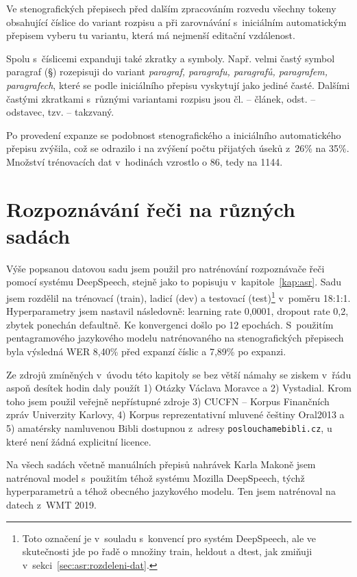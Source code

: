 Ve stenografických přepisech před dalším zpracováním rozvedu všechny tokeny
obsahující číslice do variant rozpisu a při zarovnávání s~iniciálním
automatickým přepisem vyberu tu variantu, která má nejmenší editační vzdálenost.

Spolu s~číslicemi expanduji také zkratky a symboly. Např. velmi častý symbol
paragraf (§) rozepisuji do variant {\em paragraf, paragrafu, paragrafů,
paragrafem, paragrafech}, které se podle iniciálního přepisu vyskytují jako
jediné časté. Dalšími častými zkratkami s~různými variantami rozpisu jsou {čl. -- článek,
odst. -- odstavec, tzv. -- takzvaný}.

Po provedení expanze se podobnost stenografického a iniciálního automatického
přepisu zvýšila, což se odrazilo i na zvýšení počtu přijatých úseků z~26\% na
35\%. Množství trénovacích dat v~hodinách vzrostlo o 86, tedy na 1144.

\section{Rozpoznávání řeči na různých sadách}
\label{sec:csasr:results}

Výše popsanou datovou sadu jsem použil pro natrénování rozpoznávače řeči pomocí
systému DeepSpeech, stejně jako to popisuju v~kapitole~\ref{kap:asr}. Sadu jsem
rozdělil na trénovací (train), ladicí (dev) a testovací (test)\footnote{Toto
označení je v~souladu s~konvencí pro systém DeepSpeech, ale ve skutečnosti jde
po řadě o množiny train, heldout a dtest, jak zmiňuji v~sekci~\ref{sec:asr:rozdeleni-dat}.} v~poměru 18:1:1.
Hyperparametry jsem nastavil následovně: learning rate 0,0001, dropout rate 0,2,
zbytek ponechán defaultně. Ke konvergenci došlo po 12 epochách.
S~použitím pentagramového jazykového modelu natrénovaného na
stenografických přepisech byla výsledná WER 8,40\% před expanzí číslic a 7,89\% po expanzi.

Ze zdrojů zmíněných v~úvodu této kapitoly se bez větší námahy se ziskem v~řádu
aspoň desítek hodin daly použít 1) Otázky Václava Moravce a 2) Vystadial. Krom
toho jsem použil veřejně nepřístupné zdroje 3) CUCFN -- Korpus Finančních zpráv
Univerzity Karlovy, 4) Korpus reprezentativní mluvené češtiny
Oral2013\cite{oral2013} a 5) amatérsky namluvenou Bibli dostupnou z~adresy
\texttt{poslouchamebibli.cz}, u které není žádná explicitní licence.

Na všech sadách včetně manuálních přepisů nahrávek Karla Makoně jsem natrénoval
model s~použitím téhož systému Mozilla DeepSpeech, týchž hyperparametrů a téhož
obecného jazykového modelu. Ten jsem natrénoval na datech z~WMT
2019\cite{wmt19}.

